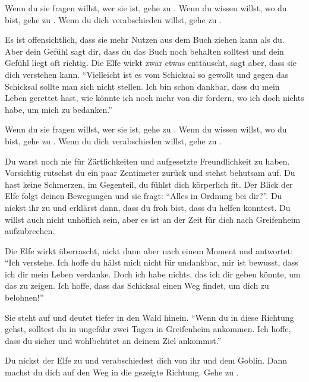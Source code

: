 Wenn du sie fragen willst, wer sie ist, gehe zu . Wenn du wissen willst, wo du bist, gehe zu .
Wenn du dich verabschieden willst, gehe zu .


Es ist offensichtlich, dass sie mehr Nutzen aus dem Buch ziehen kann als du.
Aber dein Gefühl sagt dir, dass du das Buch noch behalten solltest und dein Gefühl liegt oft richtig.
Die Elfe wirkt zwar etwas enttäuscht, sagt aber, dass sie dich verstehen kann.
``Vielleicht ist es vom Schicksal so gewollt und gegen das Schicksal sollte man sich nicht stellen. Ich bin schon dankbar, dass du mein Leben gerettet hast, wie könnte ich noch mehr von dir fordern, wo ich doch nichts habe, um mich zu bedanken.''

Wenn du sie fragen willst, wer sie ist, gehe zu . Wenn du wissen willst, wo du bist, gehe zu .
Wenn du dich verabschieden willst, gehe zu .


Du warst noch nie für Zärtlichkeiten und aufgesetzte Freundlichkeit zu haben. Vorsichtig rutschst du ein paar Zentimeter zurück und stehst behutsam auf. Du hast keine Schmerzen, im Gegenteil, du fühlst dich körperlich fit. Der Blick der Elfe folgt deinen Bewegungen und sie fragt: ``Alles in Ordnung bei dir?''. Du nickst ihr zu und erklärst dann, dass du froh bist, dass du helfen konntest. Du willst auch nicht unhöflich sein, aber es ist an der Zeit für dich nach Greifenheim aufzubrechen.

Die Elfe wirkt überrascht, nickt dann aber nach einem Moment und antwortet: ``Ich verstehe. Ich hoffe du hälst mich nicht für undankbar, mir ist bewusst, dass ich dir mein Leben verdanke. Doch ich habe nichts, das ich dir geben könnte, um das zu zeigen. Ich hoffe, dass das Schicksal einen Weg findet, um dich zu belohnen!''

Sie steht auf und deutet tiefer in den Wald hinein. ``Wenn du in diese Richtung gehst, solltest du in ungefähr zwei Tagen in Greifenheim ankommen. Ich hoffe, dass du sicher und wohlbehütet an deinem Ziel ankommst.''

Du nickst der Elfe zu und verabschiedest dich von ihr und dem Goblin. Dann machst du dich auf den Weg in die gezeigte Richtung. Gehe zu .


